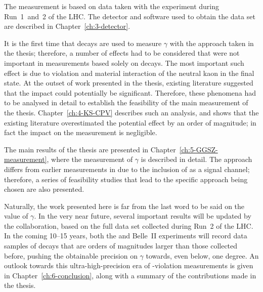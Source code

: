 The measurement is based on data taken with the \lhcb experiment during Run~1~and~2 of the LHC. The detector and software used to obtain the data set are described in Chapter~\ref{ch:3-detector}.

It is the first time that \BtoDpi decays are used to measure $\gamma$ with the approach taken in the thesis; therefore, a number of effects had to be considered that were not important in measurements based solely on \BtoDK decays. The most important such effect is due to \CP violation and material interaction of the neutral kaon in the final state. At the outset of work presented in the thesis, existing literature suggested that the impact could potentially be significant. Therefore, these phenomena had to be analysed in detail to establish the feasibility of the main measurement of the thesis. Chapter~\ref{ch:4-KS-CPV} describes such an analysis, and shows that the existing literature overestimated the potential effect by an order of magnitude; in fact the impact on the measurement is negligible.

The main results of the thesis are presented in Chapter~\ref{ch:5-GGSZ-measurement}, where the measurement of $\gamma$ is described in detail. The approach differs from earlier measurements in \lhcb due to the inclusion of \BtoDpi as a signal channel; therefore, a series of feasibility studies that lead to the specific approach being chosen are also presented.


Naturally, the work presented here is far from the last word to be said on the value of $\gamma$. In the very near future, several important results will be updated by the \lhcb collaboration, based on the full data set collected during Run~2 of the LHC. In the coming 10--15 years, both the \lhcb and Belle~II experiments will record data samples of \B decays that are orders of magnitudes larger than those collected before, pushing the obtainable precision on $\gamma$ towards, even below, one degree. An outlook towards this ultra-high-precision era of \CP-violation measurements is given in Chapter~\ref{ch:6-conclusion}, along with a summary of the contributions made in the thesis.



